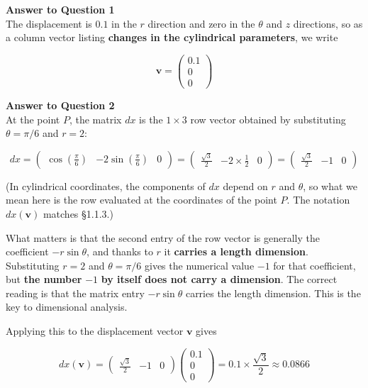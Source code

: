 \textbf{Answer to Question 1}\\
The displacement is \(0.1\) in the \(r\) direction and zero in the
\(\theta\) and \(z\) directions, so as a column vector listing
\textbf{changes in the cylindrical parameters}, we write

\[
\mathbf{v} = \begin{pmatrix} 0.1 \\ 0 \\ 0 \end{pmatrix}
\]

\textbf{Answer to Question 2}\\
At the point \(P\), the matrix \(dx\) is the \(1\times 3\) row vector
obtained by substituting \(\theta=\pi/6\) and \(r=2\):

\[
dx
=
\begin{pmatrix}
\cos(\frac{\pi}{6}) & -2\sin(\frac{\pi}{6}) & 0
\end{pmatrix}
=
\begin{pmatrix}
\frac{\sqrt{3}}{2} & -2 \times \frac{1}{2} & 0
\end{pmatrix}
=
\begin{pmatrix}
\frac{\sqrt{3}}{2} & -1 & 0
\end{pmatrix}
\]

(In cylindrical coordinates, the components of \(dx\) depend on \(r\)
and \(\theta\), so what we mean here is the row evaluated at the
coordinates of the point \(P\). The notation \(dx(\mathbf{v})\) matches
§1.1.3.)

What matters is that the second entry of the row vector is generally the
coefficient \(-r\sin\theta\), and thanks to \(r\) it \textbf{carries a
length dimension}. Substituting \(r=2\) and \(\theta=\pi/6\) gives the
numerical value \(-1\) for that coefficient, but \textbf{the number}
\(-1\) \textbf{by itself does not carry a dimension}. The correct
reading is that the matrix entry \(-r\sin\theta\) carries the length
dimension. This is the key to dimensional analysis.

Applying this to the displacement vector \(\mathbf{v}\) gives

\[
dx(\mathbf{v})
=
\begin{pmatrix}
\frac{\sqrt{3}}{2} & -1 & 0
\end{pmatrix}
\begin{pmatrix}
0.1\\
0\\
0
\end{pmatrix}
=
0.1 \times \frac{\sqrt{3}}{2}
\approx 0.0866
\]


